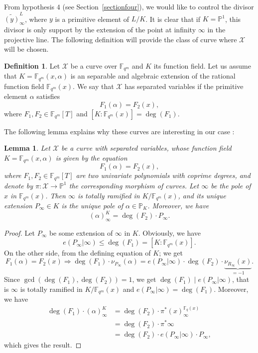 \documentclass[10pt]{article}
\newtheorem{lem1}[thm]{Lemma}
\theoremstyle{definition}
\theoremstyle{definition}
\theoremstyle{definition}
\newtheorem{def1}[thm]{Definition}
\newcommand{\s}{\vspace{0.3cm}}
\newcommand{\cd}{\cdot}
\newcommand{\PP}{\mathbb{P}}
\newcommand{\fqm}{\mathbb{F}_{q^m}}
\newcommand{\fq}{\mathbb{F}_q}
\newcommand{\X}{\mathcal{X}}
\begin{document}
\s

\color{purple}
From hypothesis $4$ (see Section~\ref{sectionfour}), we would like to control the divisor $\widetilde{(y)}^L_{\infty}$, where $y$ is a primitive element of $L/K$. It is clear that if $K=\PP^1$, this divisor is only support by the extension of the point at infinity $\infty$ in the projective line. The following definition will provide the class of curve where $\X$ will be chosen.
\color{black}

\s

\begin{def1} \label{courbes a variables separees}
Let $\X$ be a curve over $\fqm$ and $K$ its function field. Let us assume that $K=\fqm(x,\alpha)$ is an separable and algebraic extension of the rational function field $\fqm(x)$. We say that $\X$ has separated variables if the primitive element $\alpha$ satisfies
\[F_1(\alpha) = F_2(x),\]
where $F_1,F_2 \in \fqm[T]$ and $[K:\fqm(x)] = \deg({F_1})$.
\end{def1}

\s

The following lemma explains why these curves are interesting in our case :

\s

\begin{lem1} \label{lemdegre}
Let $\X$ be a curve with separated variables, whose function field $K=\fqm(x,\alpha)$ is given by the equation
\[F_1(\alpha) = F_2(x),\]
where $F_1,F_2 \in \fqm[T]$ are two univariate polynomials with coprime degrees, and denote by $\pi : \X \longrightarrow \PP^1$  the corresponding morphism of curves. Let $\infty$ be the pole of $x$ in $\fqm(x)$. Then $\infty$ is totally ramified in $K/\fqm(x)$, and its unique extension $P_{\infty} \in K$ is the unique pole of $\alpha \in \PP_K$. Moreover, we have 
\[(\alpha)^K_{\infty} = \deg{(F_2) \cd P_{\infty}}.\]
\end{lem1}

\s

\begin{proof}
Let $P_{\infty}$ be some extension of $\infty$ in $K$. Obviously, we have
\[e(P_{\infty}|\infty) \leq \deg(F_1)=[K:\fqm(x)].\]
On the other side, from the defining equation of $K$; we get
\[F_1(\alpha) = F_2(x) \Rightarrow \deg(F_1) \cd \nu_{P_{\infty}}(\alpha) = e(P_{\infty}|\infty) \cd \deg(F_2) \cd \underbrace{\nu_{R_{\infty}}(x)}_{=-1}.\]
Since $\gcd(\deg(F_1),\deg( F_2))=1$, we get $\deg(F_1) \mid e(P_{\infty}|\infty)$, that is $\infty$ is totally ramified in $K/\fqm(x)$ and $e(P_{\infty}|\infty)=\deg(F_1)$. Moreover, we have 
\begin{align*}
\deg(F_1) \cd (\alpha)^K_{\infty} &= \deg(F_2) \cd \pi^*(x)^{\fq(x)}_{\infty} \\
&= \deg(F_2) \cd \pi^*\infty \\
&= \deg(F_2) \cd e(P_{\infty}|\infty) \cd P_{\infty},
\end{align*}
which gives the result.
\end{proof}
\end{document}
